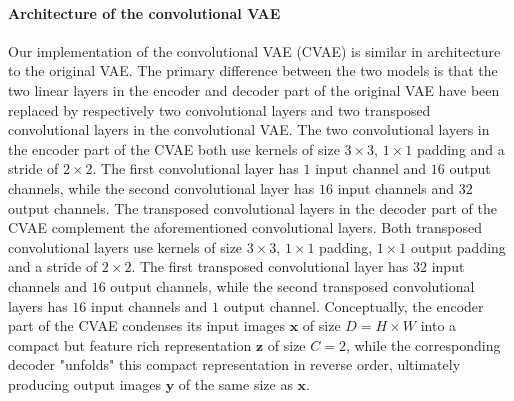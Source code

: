 
\paragraph{Architecture of the convolutional VAE}
Our implementation of the convolutional VAE  (CVAE) is similar in architecture to the original VAE\@. The primary difference between the two models is that the two linear layers in the encoder and decoder part of the original VAE have been replaced by respectively two convolutional layers and two transposed convolutional layers in the convolutional VAE\@. The two convolutional layers in the encoder part of the CVAE both use kernels of size $3\times 3$, $1\times 1$ padding and a stride of $2\times2$. The first convolutional layer has $1$ input channel and $16$ output channels, while the second convolutional layer has $16$ input channels and $32$ output channels. \iffalse As such, each convolutional layer decreases the spatial dimensions of their input by a factor of $2$, and the second convolutional layer additionally increases the feature dimension of its input by a factor $2$ to offset the loss in spatial dimensions. \fi The transposed convolutional layers in the decoder part of the CVAE complement the aforementioned convolutional layers. Both transposed convolutional layers use kernels of size $3\times3$, $1\times 1$ padding, $1\times 1$ output padding and a stride of $2\times 2$. The first transposed convolutional layer has $32$ input channels and $16$ output channels, while the second transposed convolutional layers has $16$ input channels and $1$ output channel. \iffalse As such, each transposed convolutional layers "undoes" the spatial reduction produced by a corresponding prior convolutional layer by upsampling the spatial dimensions of its input with a factor of $2$. \fi Conceptually, the encoder part of the CVAE condenses its input images $\mathbf{x}$ of size $D = H \times W$ into a compact but feature rich representation $\mathbf{z}$ of size $C = 2$, while the corresponding decoder "unfolds" this compact representation in reverse order, ultimately producing output images $\mathbf{y}$ of the same size as $\mathbf{x}$. 
